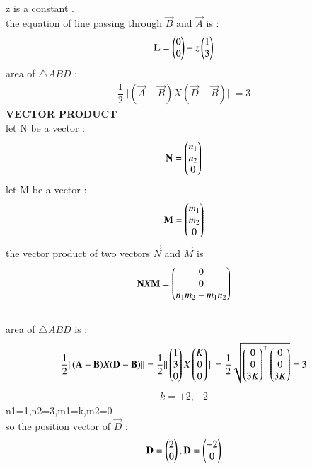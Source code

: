 \documentclass[journal,12pt,onecolumn]{IEEEtran}
\begin{document}
\\
z is a constant .
\\
the equation of line passing through  $\vec{B}$ and $\vec{A}$ is :
\\
\begin{align*}
    \mathbf{L}=\begin{pmatrix}0\\0\end{pmatrix}+z\begin{pmatrix}1\\3\end{pmatrix}
\end{align*}
area of $\triangle ABD $ : 
\\
\begin{align*}
    \dfrac{1}{2}||(\vec{A}- \vec{B})X(\vec{D}- \vec{B})||=3
\end{align*}
\textbf{VECTOR PRODUCT}
\\
let N be a vector :
\begin{align}
    \mathbf{N}=\begin{pmatrix}n_1\\n_2\\0\end{pmatrix}
    \\
    \end{align}
    let M be a vector :
    \begin{align}
    \mathbf{M}=\begin{pmatrix}m_1\\m_2\\0\end{pmatrix}
\end{align}
the vector product of two vectors $\vec{N}$ and $\vec{M}$ is 
\\
\begin{align*}
    \mathbf{N}X\mathbf{M}=\begin{pmatrix}0\\0\\n_1m_2-m_1n_2\end{pmatrix}
\end{align*}
\\
{area of $\triangle ABD$ is :}
\begin{align*}
    \dfrac{1}{2}||(\mathbf{A}-  \mathbf{B})X(\mathbf{D} -  \mathbf{B})||=\dfrac{1}{2}||\begin{pmatrix}1\\3\\0\end{pmatrix}X\begin{pmatrix}
    K\\0\\0\end{pmatrix}||= \dfrac{1}{2}\sqrt{\begin{pmatrix}0\\0\\3K\end{pmatrix}^\top\begin{pmatrix}0\\0\\3K\end{pmatrix}}=3
    \end{align*}
    \begin{align*}
        k=+2,-2
    \end{align*}
    n1=1,n2=3,m1=k,m2=0
\\

    so the position vector of $\vec{D}$ :
    \begin{align*}
        \mathbf{D}=\begin{pmatrix}2\\0\end{pmatrix},\mathbf{D}=\begin{pmatrix}-2\\0\end{pmatrix}
    \end{align*}
\end{document}
